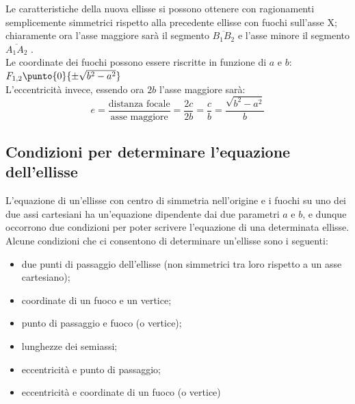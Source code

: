 Le caratteristiche della nuova ellisse si possono ottenere con ragionamenti 
semplicemente simmetrici rispetto alla precedente ellisse 
con fuochi sull'asse X; chiaramente ora l'asse maggiore sarà il segmento 
\(\overline{B_{1}B_{2}}\) e l'asse minore il segmento \(\overline{A_{1}A_{2}}\) 
.\\

\noindent Le coordinate dei fuochi possono essere riscritte in funzione di 
\(a\) e \(b\): \(F_{1,2} \punto{0}{\pm\sqrt{b^{2}-a^{2}}}\)
\\[4pt]
\noindent L'eccentricità invece, essendo ora \(2b\) l'asse maggiore sarà:
\[
e=\dfrac{\text{distanza focale}}{\text{asse maggiore}}=
\dfrac{2c}{2b}=\dfrac{c}{b}=\dfrac{\sqrt{b^{2}-a^{2}}}{b}
\]

\subsection{Condizioni per determinare l'equazione dell'ellisse}
\label{subsec:ellisse_condizioni}

L'equazione di un'ellisse con centro di simmetria nell'origine e i fuochi 
su uno dei due assi cartesiani ha un'equazione dipendente dai due parametri 
\(a\) e \(b\), e dunque occorrono due condizioni per poter scrivere l'equazione 
di una 
determinata ellisse.
Alcune condizioni che ci consentono di determinare un'ellisse 
sono i seguenti:
\begin{itemize} [noitemsep]
  \item due punti di passaggio dell'ellisse (non simmetrici tra 
loro rispetto a un asse cartesiano);
  \item coordinate di un fuoco e un vertice;
  \item punto di passaggio e fuoco (o vertice);
  \item lunghezze dei semiassi;
  \item eccentricità e punto di passaggio;
  \item eccentricità e coordinate di un fuoco (o vertice)
\end{itemize}

%

